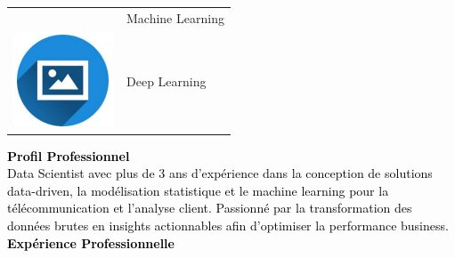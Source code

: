 \documentclass{article}
\begin{document}
\begin{paracol}{2}
\begin{tabular}{ll}
\begin{minipage}{0.1\linewidth}
         \end{minipage} & Machine Learning \\[10pt]
         \begin{minipage}{0.1\linewidth}
         \includegraphics[width=\linewidth]{picon.png}
         \end{minipage} & Deep Learning \\[10pt]
        \end{tabular}
        
\switchcolumn
\color{black}

\textcolor{black}{\Large \textbf{Profil Professionnel}} \\

\textcolor{black}{Data Scientist avec plus de 3 ans d’expérience dans la conception de solutions data-driven, la modélisation statistique et le machine learning pour la télécommunication et l’analyse client. Passionné par la transformation des données brutes en insights actionnables afin d’optimiser la performance business.}\\[8pt]

\textcolor{black}{\Large \textbf{Expérience Professionnelle}} \\


\end{paracol}
\end{document}
